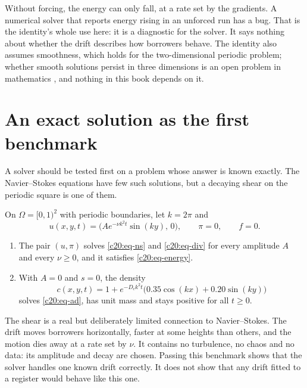 Without forcing, the energy can only fall, at a rate set by the gradients. A numerical
solver that reports energy rising in an unforced run has a bug. That is the identity's whole
use here: it is a diagnostic for the solver. It says nothing about whether the drift describes
how borrowers behave. The identity also assumes smoothness, which holds for the two-dimensional periodic problem; whether smooth solutions persist in three dimensions is an
open problem in mathematics \citep{fefferman2006}, and nothing in this book depends on it.

\section{An exact solution as the first benchmark}

A solver should be tested first on a problem whose answer is known exactly. The Navier--Stokes
equations have few such solutions, but a decaying shear on the periodic square is
one of them.

\begin{proposition}\label{c20:prop-exact}
On $\Omega=[0,1)^2$ with periodic boundaries, let $k=2\pi$ and
\begin{equation}\label{c20:eq-shear}
u(x,y,t)=\big(Ae^{-\nu k^2t}\sin(ky),\,0\big),\qquad\pi=0,\qquad f=0.
\end{equation}
\begin{enumerate}
\item The pair $(u,\pi)$ solves \eqref{c20:eq-ns} and \eqref{c20:eq-div} for every amplitude $A$ and every $\nu\ge0$, and it satisfies \eqref{c20:eq-energy}.
\item With $A=0$ and $s=0$, the density
\begin{equation}\label{c20:eq-exact}
c(x,y,t)=1+e^{-D_ck^2t}\big(0.35\cos(kx)+0.20\sin(ky)\big)
\end{equation}
solves \eqref{c20:eq-ad}, has unit mass and stays positive for all $t\ge0$.
\end{enumerate}
\end{proposition}

The shear is a real but deliberately limited connection to Navier--Stokes. The drift moves
borrowers horizontally, faster at some heights than others, and the motion dies away at a
rate set by $\nu$. It contains no turbulence, no chaos and no data: its amplitude and decay are
chosen. Passing this benchmark shows that the solver handles one known drift correctly. It
does not show that any drift fitted to a register would behave like this one.

